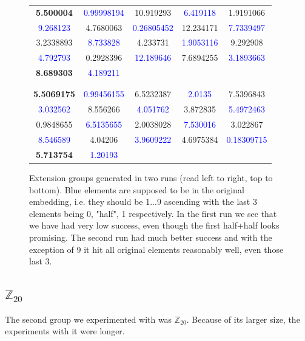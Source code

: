 \begin{figure}[h]
\centering
\caption{Extension groups generated in two runs (read left to right, top to bottom). Blue elements are supposed to be in the original embedding, i.e. they should be 1...9 ascending with the last 3 elements being 0, "half", 1 respectively. In the first run we see that we have had very low success, even though the first half+half looks promising. The second run had much better success and with the exception of 9 it hit all original elements reasonably well, even those last 3.}
\label{table:z10_half_generator}
\begin{tabular}{ccccc}
\textbf{5.500004} & \textcolor{blue}{0.99998194} & 10.919293 & \textcolor{blue}{6.419118} & 1.9191066\\
 \textcolor{blue}{9.268123} & 4.7680063 & \textcolor{blue}{0.26805452} & 12.234171 & \textcolor{blue}{7.7339497}\\
3.2338893 & \textcolor{blue}{8.733828} & 4.233731 & \textcolor{blue}{1.9053116} & 9.292908 \\
\textcolor{blue}{4.792793} & 0.2928396 & \textcolor{blue}{12.189646} & 7.6894255 & \textcolor{blue}{3.1893663}\\
\textbf{8.689303} & \textcolor{blue}{4.189211}\\
 \\
\hline\\

\textbf{5.5069175} & \textcolor{blue}{0.99456155} & 6.5232387 & \textcolor{blue}{2.0135} & 7.5396843\\
\textcolor{blue}{3.032562} & 8.556266 & \textcolor{blue}{4.051762} & 3.872835 & \textcolor{blue}{5.4972463}\\
0.9848655 & \textcolor{blue}{6.5135655} & 2.0038028 & \textcolor{blue}{7.530016} & 3.022867\\
\textcolor{blue}{8.546589} & 4.04206 & \textcolor{blue}{3.9609222} & 4.6975384 & \textcolor{blue}{0.18309715}\\
\textbf{5.713754} & \textcolor{blue}{1.20193}
\end{tabular}

\end{figure}


\subsection{$\mathbb{Z}_{20}$}
The second group we experimented with was $\mathbb{Z}_{20}$. Because of its larger size, the experiments with it were longer. 

